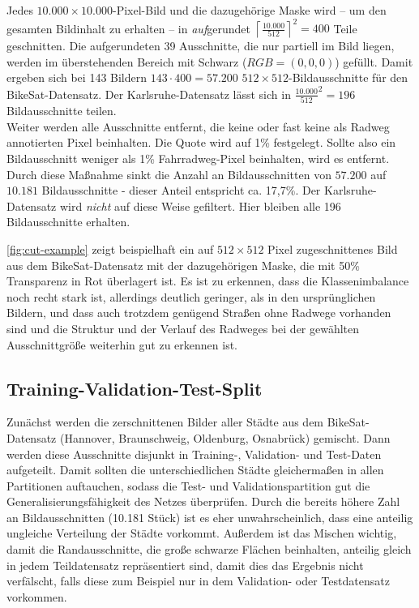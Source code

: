 Jedes $10.000{\times}10.000$-Pixel-Bild und die dazugehörige Maske wird -- um den gesamten Bildinhalt zu erhalten -- in \textit{auf}gerundet
$\left\lceil{\frac{10.000}{512}}\right\rceil^2 = 400$ Teile geschnitten. 
Die aufgerundeten 39 Ausschnitte, die nur partiell im Bild liegen, werden im überstehenden Bereich mit Schwarz ($RGB=(0,0,0)$) gefüllt.
Damit ergeben sich bei 143 Bildern $143 \cdot 400 = 57.200$ $512{\times}512$-Bildausschnitte für den BikeSat-Datensatz. 
Der Karlsruhe-Datensatz lässt sich in ${\frac{10.000}{512}}^2 = 196$ Bildausschnitte teilen.\\
Weiter werden alle Ausschnitte entfernt, die keine oder fast keine als Radweg annotierten Pixel beinhalten. 
Die Quote wird auf 1\% festgelegt. Sollte also ein Bildausschnitt weniger als 1\% Fahrradweg-Pixel beinhalten, 
wird es entfernt. Durch diese Maßnahme sinkt die Anzahl an Bildausschnitten von $57.200$ auf $10.181$ Bildausschnitte - 
dieser Anteil entspricht ca. 17,7\%. Der Karlsruhe-Datensatz wird \textit{nicht} auf diese Weise gefiltert. Hier bleiben alle 196 
Bildausschnitte erhalten.
 
\autoref{fig:cut-example} zeigt beispielhaft ein auf $512{\times}512$ Pixel zugeschnittenes Bild aus dem BikeSat-Datensatz 
mit der dazugehörigen Maske, die mit 50\% Transparenz in Rot überlagert ist. Es ist zu erkennen, 
dass die Klassenimbalance noch recht stark ist, allerdings deutlich geringer, als in den ursprünglichen Bildern,
und dass auch trotzdem genügend Straßen ohne Radwege vorhanden sind und die Struktur und der Verlauf des Radweges 
bei der gewählten Ausschnittgröße weiterhin gut zu erkennen ist. 

\subsection{Training-Validation-Test-Split}

Zunächst werden die zerschnittenen Bilder aller Städte aus dem BikeSat-Datensatz 
(Hannover, Braunschweig, Oldenburg, Osnabrück) gemischt. Dann werden diese Ausschnitte disjunkt in 
Training-, Validation- und Test-Daten aufgeteilt. 
Damit sollten die unterschiedlichen Städte gleichermaßen in allen Partitionen auftauchen, 
sodass die Test- und Validationspartition gut die Generalisierungsfähigkeit des Netzes überprüfen. 
Durch die bereits höhere Zahl an Bildausschnitten (10.181 Stück) ist es eher unwahrscheinlich, 
dass eine anteilig ungleiche Verteilung der Städte vorkommt. Außerdem ist das Mischen wichtig, 
damit die Randausschnitte, die große schwarze Flächen beinhalten, anteilig gleich in 
jedem Teildatensatz repräsentiert sind, damit dies das Ergebnis nicht verfälscht, falls diese 
zum Beispiel nur in dem Validation- oder Testdatensatz vorkommen. 

